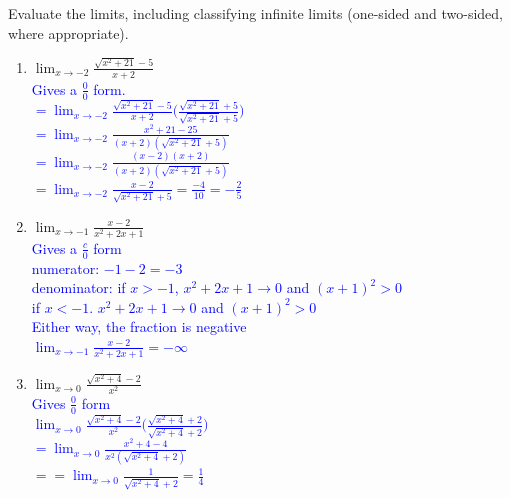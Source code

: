 \documentclass{ximera}
\begin{document}
\begin{exercise}
    Evaluate the limits, including classifying infinite limits (one-sided and two-sided, where appropriate).
\begin{enumerate}
    \item $\displaystyle \lim_{x\rightarrow -2}\frac{\sqrt{x^2+21}-5}{x+2}$ \\
    \textcolor{blue}{ Gives a $\frac{0}{0}$ form.\\
    $\displaystyle=\lim_{x\rightarrow -2} \frac{\sqrt{x^2+21}-5}{x+2}\bigg(\frac{\sqrt{x^2+21}+5}{\sqrt{x^2+21}+5}\bigg)$\\
    $\displaystyle=\lim_{x\rightarrow-2} \frac{x^2+21-25}{(x+2)(\sqrt{x^2+21}+5)}$\\
    $\displaystyle=\lim_{x\rightarrow -2}\frac{(x-2)(x+2)}{(x+2)(\sqrt{x^2+21}+5)}$\\
    $\displaystyle=\lim_{x\rightarrow -2}\frac{x-2}{\sqrt{x^2+21}+5}=\frac{-4}{10}=-\frac25$}
    
    \item $\displaystyle \lim_{x\rightarrow -1}\frac{x-2}{x^2+2x+1}$ \\
    \textcolor{blue}{ Gives a $\frac{c}{0}$ form\\
    numerator: $-1-2=-3$\\
    denominator: if $x>-1$, $x^2+2x+1\rightarrow 0$ and $(x+1)^2>0$\\
    if $x<-1$. $x^2+2x+1\rightarrow 0$ and $(x+1)^2>0$\\
    Either way, the fraction is negative\\
    $\displaystyle\lim_{x\rightarrow -1}\frac{x-2}{x^2+2x+1}=-\infty$}
    
    
    \item $\displaystyle\lim_{x\rightarrow 0}\frac{\sqrt{x^2+4}-2}{x^2}$ \\
    \textcolor{blue}{ Gives $\frac00$ form\\
    $\displaystyle\lim_{x\rightarrow 0}\frac{\sqrt{x^2+4}-2}{x^2}\bigg(\frac{\sqrt{x^2+4}+2}{\sqrt{x^2+4}+2}\bigg)$\\
    $\displaystyle =\lim_{x\rightarrow 0}\frac{x^2+4-4}{x^2(\sqrt{x^2+4}+2)}$\\
    $=\displaystyle =\lim_{x\rightarrow 0}\frac{1}{\sqrt{x^2+4}+2}=\frac{1}{4}$}
    


\end{enumerate}
\end{exercise}
\end{document}
